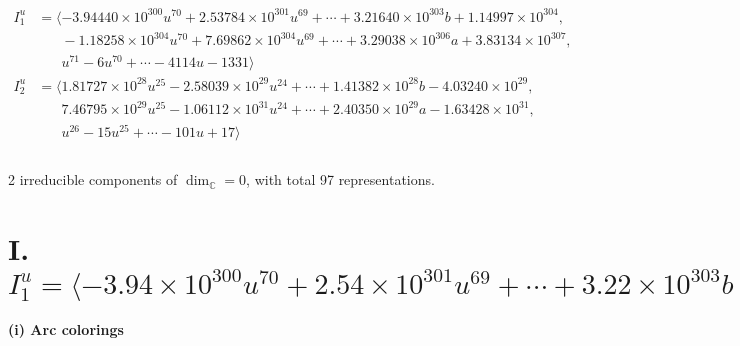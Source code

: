 \documentclass[1p]{elsarticle_modified}
\theoremstyle{definition}
\begin{document}
\begin{align*}
I^u_{1}&=\langle 
-3.94440\times10^{300} u^{70}+2.53784\times10^{301} u^{69}+\cdots+3.21640\times10^{303} b+1.14997\times10^{304},\\
\phantom{I^u_{1}}&\phantom{= \langle  }-1.18258\times10^{304} u^{70}+7.69862\times10^{304} u^{69}+\cdots+3.29038\times10^{306} a+3.83134\times10^{307},\\
\phantom{I^u_{1}}&\phantom{= \langle  }u^{71}-6 u^{70}+\cdots-4114 u-1331\rangle \\
I^u_{2}&=\langle 
1.81727\times10^{28} u^{25}-2.58039\times10^{29} u^{24}+\cdots+1.41382\times10^{28} b-4.03240\times10^{29},\\
\phantom{I^u_{2}}&\phantom{= \langle  }7.46795\times10^{29} u^{25}-1.06112\times10^{31} u^{24}+\cdots+2.40350\times10^{29} a-1.63428\times10^{31},\\
\phantom{I^u_{2}}&\phantom{= \langle  }u^{26}-15 u^{25}+\cdots-101 u+17\rangle \\
\\
\end{align*}
\raggedright * 2 irreducible components of $\dim_{\mathbb{C}}=0$, with total 97 representations.\\
\newpage
\renewcommand{\arraystretch}{1}
\centering \section*{I. $I^u_{1}= \langle -3.94\times10^{300} u^{70}+2.54\times10^{301} u^{69}+\cdots+3.22\times10^{303} b+1.15\times10^{304},\;-1.18\times10^{304} u^{70}+7.70\times10^{304} u^{69}+\cdots+3.29\times10^{306} a+3.83\times10^{307},\;u^{71}-6 u^{70}+\cdots-4114 u-1331 \rangle$}
\flushleft \textbf{(i) Arc colorings}\\
\end{document}
